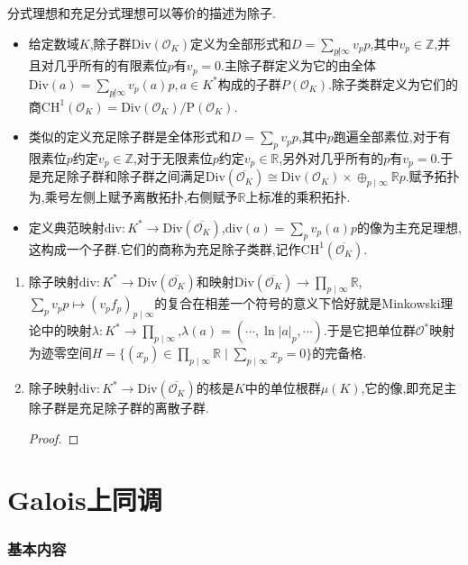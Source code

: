 分式理想和充足分式理想可以等价的描述为除子.
\begin{itemize}
	\item 给定数域$K$,除子群$\mathrm{Div}(\mathscr{O}_K)$定义为全部形式和$D=\sum_{p\not|\infty}v_pp$,其中$v_p\in\mathbb{Z}$,并且对几乎所有的有限素位$p$有$v_p=0$.主除子群定义为它的由全体$\mathrm{Div}(a)=\sum_{p\not|\infty}v_p(a)p,a\in K^*$构成的子群$P(\mathscr{O}_K)$.除子类群定义为它们的商$\mathrm{CH}^1(\mathscr{O}_K)=\mathrm{Div}(\mathscr{O}_K)/\mathrm{P}(\mathscr{O}_K)$.
	\item 类似的定义充足除子群是全体形式和$D=\sum_pv_pp$,其中$p$跑遍全部素位,对于有限素位$p$约定$v_p\in\mathbb{Z}$,对于无限素位$p$约定$v_p\in\mathbb{R}$,另外对几乎所有的$p$有$v_p=0$.于是充足除子群和除子群之间满足$\mathrm{Div}(\overline{\mathscr{O}_K})\cong\mathrm{Div}(\mathscr{O}_K)\times\oplus_{p\mid\infty}\mathbb{R}p$.赋予拓扑为,乘号左侧上赋予离散拓扑,右侧赋予$\mathbb{R}$上标准的乘积拓扑.
	\item 定义典范映射$\mathrm{div}:K^*\to\mathrm{Div}(\overline{\mathscr{O}_K})$,$\mathrm{div}(a)=\sum_pv_p(a)p$的像为主充足理想,这构成一个子群.它们的商称为充足除子类群,记作$\mathrm{CH}^1(\overline{\mathscr{O}_K})$.
\end{itemize}
\begin{enumerate}
	\item 除子映射$\mathrm{div}:K^*\to\mathrm{Div}(\overline{\mathscr{O}_K})$和映射$\mathrm{Div}(\overline{\mathscr{O}_K})\to\prod_{p\mid\infty}\mathbb{R}$,$\sum_pv_pp\mapsto(v_pf_p)_{p\mid\infty}$的复合在相差一个符号的意义下恰好就是Minkowski理论中的映射$\lambda:K^*\to\prod_{p\mid\infty}$,$\lambda(a)=(\cdots,\ln|a|_p,\cdots)$.于是它把单位群$\mathscr{O}^*$映射为迹零空间$H=\{(x_p)\in\prod_{p\mid\infty}\mathbb{R}\mid\sum_{p\mid\infty}x_p=0\}$的完备格.
	\item 除子映射$\mathrm{div}:K^*\to\mathrm{Div}(\overline{\mathscr{O}_K})$的核是$K$中的单位根群$\mu(K)$,它的像,即充足主除子群是充足除子群的离散子群.
	\begin{proof}
		
		
	\end{proof}
\end{enumerate}

\newpage
\section{Galois上同调}
\subsubsection{基本内容}


